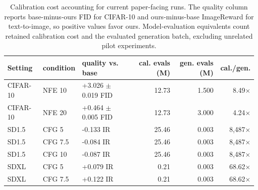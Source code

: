 \begin{table}[t]
  \centering
  \caption{Calibration cost accounting for current paper-facing runs.
  The quality column reports base-minus-ours FID for CIFAR-10 and
  ours-minus-base ImageReward for text-to-image, so positive values favor
  ours. Model-evaluation equivalents count retained calibration
  cost and the evaluated generation batch, excluding unrelated pilot
  experiments.}
  \label{tab:calibration-cost-summary}
  \begin{tabular}{lllrrr}
    \toprule
    Setting & condition & quality vs. base & cal. evals (M) & gen. evals (M) & cal./gen. \\
    \midrule
    CIFAR-10 & NFE 10 & +3.026 $\pm$ 0.019 FID & 12.73 & 1.500 & 8.49$\times$ \\
    CIFAR-10 & NFE 20 & +0.464 $\pm$ 0.005 FID & 12.73 & 3.000 & 4.24$\times$ \\
    SD1.5 & CFG 5 & -0.133 IR & 25.46 & 0.003 & 8{,}487$\times$ \\
    SD1.5 & CFG 7.5 & -0.084 IR & 25.46 & 0.003 & 8{,}487$\times$ \\
    SD1.5 & CFG 10 & -0.087 IR & 25.46 & 0.003 & 8{,}487$\times$ \\
    SDXL & CFG 5 & +0.079 IR & 0.21 & 0.003 & 68.62$\times$ \\
    SDXL & CFG 7.5 & +0.122 IR & 0.21 & 0.003 & 68.62$\times$ \\
    \bottomrule
  \end{tabular}
\end{table}
